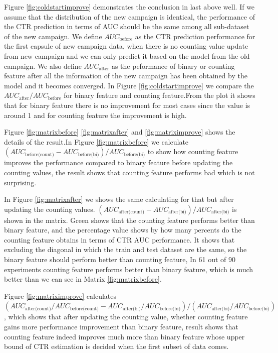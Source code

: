 \documentclass{sig-alternate}
\begin{document}
Figure \ref{fig:coldstartimprove} demonstrates the conclusion in last above well. If we assume that the distribution of the new campaign is identical, the performance of the CTR prediction in terms of AUC should be the same among all sub-dataset of the new campaign. We define  \(AUC_{\text{before}}\) as the CTR prediction performance for the first capsule of new campaign data, when there is no counting value update from new campaign and we can only predict it based on the model from the old campaign. We also define \(AUC_{\text{after}}\) as the peformance of binary or counting feature after all the information of the new campaign has been obtained by the model and it becomes converged. In Figure \ref{fig:coldstartimprove} we compare the\({AUC_{\text{after}}}/{AUC_{\text{before}}}\)
for binary feature and counting feature.From the plot it shows that for binary feature there is no improvement for most cases since the value is around 1 and for counting feature the improvement is high. 



Figure \ref{fig:matrixbefore} \ref{fig:matrixafter} and \ref{fig:matriximprove} shows the details of the result.In Figure \ref{fig:matrixbefore} we calculate \((AUC_{\text{before(count)}} - AUC_{\text{before(bi)}}) / AUC_{\text{before(bi)}} \) to show how counting feature improves the performance compared to binary feature before updating the counting values, the result shows that counting feature performs bad which is not surprising. 

In Figure \ref{fig:matrixafter} we shows the same calculating for that but after updating the counting values.  \((AUC_{\text{after(count)}} - AUC_{\text{after(bi)}}) / AUC_{\text{after(bi)}} \) is shown in the matrix. Green shows that the counting feature performs better than binary feature, and the percentage value shows by how many percents do the counting feature obtains in terms of CTR AUC performance. It shows that excluding the diagonal in which the train and test dataset are the same, so the binary feature should perform better than counting feature, In 61 out of 90 experiments counting feature performs better than binary feature, which is much better than we can see in Matrix \ref{fig:matrixbefore}.

Figure \ref{fig:matriximprove} calculates 
\((AUC_{\text{after(count)}}/AUC_{\text{before(count)}} -AUC_{\text{after(bi)}}/AUC_{\text{before(bi)}})  / (AUC_{\text{after(bi)}}/AUC_{\text{before(bi)}})  \), which shows that after updating the counting value, whether counting feature gains more performance improvement than binary feature, result shows that counting feature indeed improves much more than binary feature whose upper bound of CTR estimation is decided when the first subset of data comes. 
\end{document}
